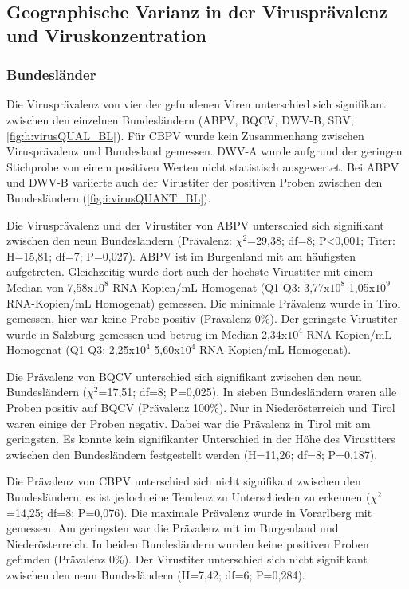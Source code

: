 \subsection{Geographische Varianz in der Virusprävalenz und Viruskonzentration}
\subsubsection{Bundesländer}

Die Virusprävalenz von vier der gefundenen Viren unterschied sich signifikant zwischen den einzelnen Bundesländern (ABPV, BQCV, DWV-B, SBV; \cref{fig:h:virusQUAL_BL}). 
 Für CBPV wurde kein Zusammenhang zwischen Virusprävalenz und Bundesland gemessen. DWV-A wurde aufgrund der geringen Stichprobe von einem positiven Werten nicht statistisch ausgewertet. Bei ABPV und DWV-B variierte auch der Virustiter der positiven Proben zwischen den Bundesländern (\cref{fig:i:virusQUANT_BL}). 

Die Virusprävalenz und der Virustiter von ABPV unterschied sich signifikant zwischen den neun Bundesländern (Prävalenz: $\chi^2$=29,38; df=8; P<0,001; Titer: H=15,81; df=7; P=0,027). ABPV ist im Burgenland mit  am häufigsten aufgetreten. Gleichzeitig wurde dort auch der höchste Virustiter mit einem Median von 7,58x$10^8$ RNA-Kopien/\si{\milli\liter} Homogenat (Q1-Q3: 3,77x$10^8$-1,05x$10^9$ RNA-Kopien/\si{\milli\liter} Homogenat) gemessen. Die minimale Prävalenz wurde in Tirol gemessen, hier war keine Probe positiv (Prävalenz 0\%). Der geringste Virustiter wurde in Salzburg gemessen und betrug im Median 2,34x$10^4$ RNA-Kopien/\si{\milli\liter} Homogenat (Q1-Q3: 2,25x$10^4$-5,60x$10^4$ RNA-Kopien/\si{\milli\liter} Homogenat).

Die Prävalenz von BQCV unterschied sich signifikant zwischen den neun Bundesländern ($\chi ^2$=17,51; df=8; P=0,025). In sieben Bundesländern waren alle Proben positiv auf BQCV (Prävalenz 100\%). Nur in Niederösterreich und Tirol waren einige der Proben negativ. Dabei war die Prävalenz in Tirol mit  am geringsten. Es konnte kein signifikanter Unterschied in der Höhe des Virustiters zwischen den Bundesländern festgestellt werden (H=11,26; df=8; P=0,187).

Die Prävalenz von CBPV unterschied sich nicht signifikant zwischen den Bundesländern, es ist jedoch eine Tendenz zu Unterschieden zu erkennen ($\chi^2$=14,25; df=8; P=0,076). Die maximale Prävalenz wurde in Vorarlberg mit  gemessen. Am geringsten war die Prävalenz mit im Burgenland und Niederösterreich. In beiden Bundesländern wurden keine positiven Proben gefunden (Prävalenz 0\%). Der Virustiter unterschied sich nicht signifikant zwischen den neun Bundesländern (H=7,42; df=6; P=0,284).

